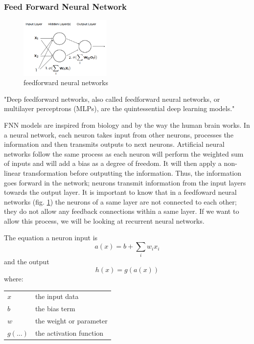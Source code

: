 \documentclass[6pt,letter]{article}\usepackage[]{graphicx}\usepackage[]{color}
\makeatletter
\newenvironment{conditions}
  {\par\vspace{\abovedisplayskip}\noindent\begin{tabular}{>{$}l<{$} @{${}={}$} l}}
  {\end{tabular}\par\vspace{\belowdisplayskip}}
\makeatother
\begin{document}
\subsubsection{Feed Forward Neural Network}
\begin{figure}
  \begin{center}
    \includegraphics[width=0.4\textwidth]{figure/feedforward_neural_networks.png}
  \end{center}
  \caption{feedforward neural networks}
  \label{fig:attention}
\end{figure}

"Deep feedforward networks, also called feedforward neural networks, or multilayer perceptrons (MLPs), are the quintessential deep learning models." \cite{Goodfellow-et-al-2016}

FNN models are inspired from biology and by the way the human brain works. In a neural network, each neuron takes input from other neurons, processes the information and then transmits outputs to next neurons. Artificial neural networks follow the same process as each neuron will perform the weighted sum of inputs and will add a bias as a degree of freedom. It will then apply a non-linear transformation before outputting the information. Thus, the information goes forward in the network; neurons transmit information from the input layers towards the output layer. It is important to know that in a feedfoward neural networks (fig. \ref{fig:attention}) the neurons of a same layer are not connected to each other; they do not allow any feedback connections within a same layer. If we want to allow this process, we will be looking at recurrent neural networks.

The equation a neuron input is  
\begin{equation}
a(x) = b +\sum_{i}{w_i x_i}
\end{equation}
and the output
\begin{equation}
h(x) = g(a(x))
\end{equation}
where:
\begin{conditions}
 x     &  the input data \\
 b     &  the bias term \\
 w     &  the weight or parameter \\   
 g(...) &  the activation function
\end{conditions}
\end{document}
